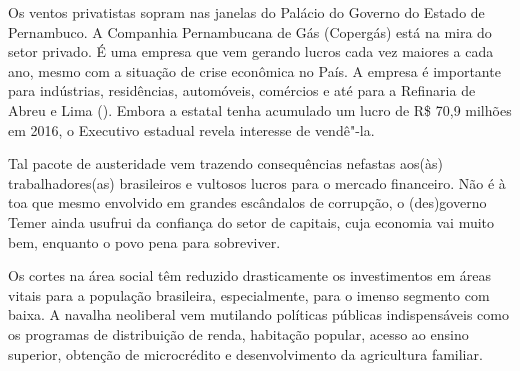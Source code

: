Os ventos privatistas sopram nas janelas do Palácio do Governo do Estado
de Pernambuco. A Companhia Pernambucana de Gás (Copergás) está na mira
do setor privado. É uma empresa que vem gerando lucros cada vez maiores
a cada ano, mesmo com a situação de crise econômica no País. A empresa é
importante para indústrias, residências, automóveis, comércios e até
para a Refinaria de Abreu e Lima (). Embora a estatal tenha acumulado
um lucro de R\$ 70,9 milhões em 2016, o Executivo estadual revela
interesse de vendê"-la.

Tal pacote de austeridade vem trazendo consequências nefastas aos(às)
trabalhadores(as) brasileiros e vultosos lucros para o mercado
financeiro. Não é à toa que mesmo envolvido em grandes escândalos de
corrupção, o (des)governo Temer ainda usufrui da confiança do setor de
capitais, cuja economia vai muito bem, enquanto o povo pena para
sobreviver.

Os cortes na área social têm reduzido drasticamente os investimentos em
áreas vitais para a população brasileira, especialmente, para o imenso
segmento com baixa. A navalha neoliberal vem mutilando políticas
públicas indispensáveis como os programas de distribuição de renda,
habitação popular, acesso ao ensino superior, obtenção de microcrédito e
desenvolvimento da agricultura familiar.

